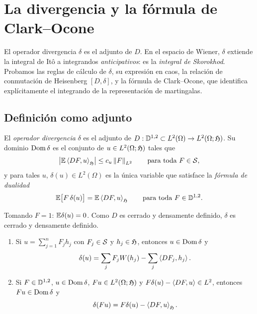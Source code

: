 \chapter{La divergencia y la fórmula de Clark--Ocone}\label{cap:divergencia}

\begin{panorama}
El operador divergencia $\delta$ es el adjunto de $D$. En el espacio de Wiener, $\delta$ extiende la
integral de Itô a integrandos \emph{anticipativos}: es la \emph{integral de Skorokhod}. Probamos las
reglas de cálculo de $\delta$, su expresión en caos, la relación de conmutación de Heisenberg
$[D,\delta]$, y la fórmula de Clark--Ocone, que identifica explícitamente el integrando de la
representación de martingalas.
\end{panorama}

\section{Definición como adjunto}

\begin{definicion}
El \emph{operador divergencia} $\delta$ es el adjunto de $D:\mathbb{D}^{1,2}\subset L^2(\Omega)\to L^2(\Omega;\mathfrak{H})$.
Su dominio $\operatorname{Dom}\delta$ es el conjunto de $u\in L^2(\Omega;\mathfrak{H})$ tales que
\[
  \left\lvert \mathbb{E}\left\langle DF, u\right\rangle_{\mathfrak{H}}\right\rvert\le c_u\left\lVert F\right\rVert_{L^2}\qquad\text{para toda }F\in\mathcal{S},
\]
y para tales $u$, $\delta(u)\in L^2(\Omega)$ es la única variable que satisface la \emph{fórmula de dualidad}
\begin{equation}\label{eq:dualidad}
  \mathbb{E}\big[F\,\delta(u)\big]=\mathbb{E}\left\langle DF, u\right\rangle_{\mathfrak{H}}\qquad\text{para toda }F\in\mathbb{D}^{1,2}.
\end{equation}
\end{definicion}

Tomando $F=1$: $\mathbb{E}\delta(u)=0$. Como $D$ es cerrado y densamente definido, $\delta$ es cerrado y
densamente definido.

\begin{proposicion}\label{prop:reglas-delta}
\begin{enumerate}[label=(\roman*)]
  \item Si $u=\sum_{j=1}^nF_jh_j$ con $F_j\in\mathcal{S}$ y $h_j\in\mathfrak{H}$, entonces $u\in\operatorname{Dom}\delta$ y
  \[
    \delta(u)=\sum_jF_jW(h_j)-\sum_j\left\langle DF_j, h_j\right\rangle.
  \]
  \item Si $F\in\mathbb{D}^{1,2}$, $u\in\operatorname{Dom}\delta$, $Fu\in L^2(\Omega;\mathfrak{H})$ y $F\delta(u)-\left\langle DF, u\right\rangle\in L^2$, entonces $Fu\in\operatorname{Dom}\delta$ y
  \[
    \delta(Fu)=F\delta(u)-\left\langle DF, u\right\rangle_{\mathfrak{H}}.
  \]
\end{enumerate}
\end{proposicion}


